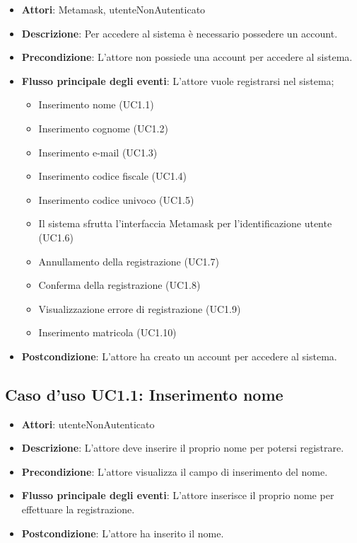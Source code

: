 \begin{itemize}
\item \textbf{Attori}: Metamask, utenteNonAutenticato
\item \textbf{Descrizione}: Per accedere al sistema è necessario possedere un account.
\item \textbf{Precondizione}: L'attore non possiede una account per accedere al sistema.
\item \textbf{Flusso principale degli eventi}: L'attore vuole registrarsi nel sistema;
\begin{itemize}
\item Inserimento nome (UC1.1)
\item Inserimento cognome (UC1.2)
\item Inserimento e-mail (UC1.3)
\item Inserimento codice fiscale (UC1.4)
\item Inserimento codice univoco (UC1.5)
\item Il sistema sfrutta l'interfaccia Metamask per l'identificazione utente (UC1.6)
\item Annullamento della registrazione (UC1.7)
\item Conferma della registrazione (UC1.8)
\item Visualizzazione errore di registrazione (UC1.9)
\item Inserimento matricola (UC1.10)
\end{itemize}
\item \textbf{Postcondizione}: L'attore ha creato un account per accedere al sistema.
\end{itemize}
\subsection{Caso d'uso \texorpdfstring{UC1.1}{UC1.1}: Inserimento nome}
\begin{itemize}
\item \textbf{Attori}: utenteNonAutenticato
\item \textbf{Descrizione}: L'attore deve inserire il proprio nome per potersi registrare.
\item \textbf{Precondizione}: L'attore visualizza il campo di inserimento del nome.
\item \textbf{Flusso principale degli eventi}: L'attore inserisce il proprio nome per effettuare la registrazione.
\item \textbf{Postcondizione}: L'attore ha inserito il nome.
\end{itemize}
